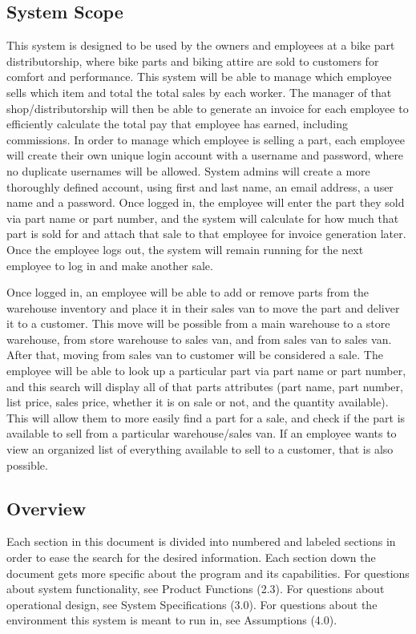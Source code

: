 \documentclass{report}
\begin{document}
\subsection{System Scope}
This system is designed to be used by the owners and employees at a bike part distributorship, where bike parts and biking attire are sold to customers for comfort and performance. This system will be able to manage which employee sells which item and total the total sales by each worker. The manager of that shop/distributorship will then be able to generate an invoice for each employee to efficiently calculate the total pay that employee has earned, including commissions. In order to manage which employee is selling a part, each employee will create their own unique login account with a username and password, where no duplicate usernames will be allowed. System admins will create a more thoroughly defined account, using first and last name, an email address, a user name and a password. Once logged in, the employee will enter the part they sold via part name or part number, and the system will calculate for how much that part is sold for and attach that sale to that employee for invoice generation later. Once the employee logs out, the system will remain running for the next employee to log in and make another sale.\par
Once logged in, an employee will be able to add or remove parts from the warehouse inventory and place it in their sales van to move the part and deliver it to a customer. This move will be possible from a main warehouse to a store warehouse, from store warehouse to sales van, and from sales van to sales van. After that, moving from sales van to customer will be considered a sale. The employee will be able to look up a particular part via part name or part number, and this search will display all of that parts attributes (part name, part number, list price, sales price, whether it is on sale or not, and the quantity available). This will allow them to more easily find a part for a sale, and check if the part is available to sell from a particular warehouse/sales van. If an employee wants to view an organized list of everything available to sell to a customer, that is also possible.\par
\subsection{Overview}
Each section in this document is divided into numbered and labeled sections in order to ease the search for the desired information. Each section down the document gets more specific about the program and its capabilities. For questions about system functionality, see Product Functions (2.3). For questions about operational design, see System Specifications (3.0). For questions about the environment this system is meant to run in, see Assumptions (4.0).\par
\end{document}
